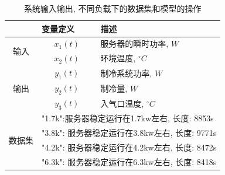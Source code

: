\begin{table}[ht]
    \centering
\caption{系统输入输出, 不同负载下的数据集和模型的操作}
\label{tab:sys_in_out_prior}
\begin{tabular}{cll}
\toprule
\multicolumn{1}{c}{}                                  & 变量定义                      & 描述                                    \\ \hline
\multicolumn{1}{c|}{\multirow{2}{*}{输入}}          & \multicolumn{1}{c|}{$x_1(t)$}& 服务器的瞬时功率,  $W$            \\ \cline{2-3} 
\multicolumn{1}{c|}{}                                 & \multicolumn{1}{c|}{$x_2(t)$}& 环境温度, $^{\circ}C$          \\ \hline
\multicolumn{1}{c|}{\multirow{3}{*}{输出}}         & \multicolumn{1}{c|}{$y_1(t)$}& 制冷系统功率,  $W$                  \\ \cline{2-3} 
\multicolumn{1}{c|}{}                                 & \multicolumn{1}{c|}{$y_2(t)$} & 制冷量,  $W$                     \\ \cline{2-3} 
\multicolumn{1}{c|}{}                                 & \multicolumn{1}{c|}{$y_3(t)$}& 入气口温度,  $^{\circ}C$  \\ \hline
\multicolumn{1}{c|}{\multirow{4}{*}{数据集}} & \multicolumn{2}{l}{"1.7k":服务器稳定运行在1.7kw左右, 长度: 8853s}  \\ \cline{2-3} 
\multicolumn{1}{c|}{}                                 & \multicolumn{2}{l}{"3.8k": 服务器稳定运行在3.8kw左右, 长度: 9771s}  \\ \cline{2-3} 
\multicolumn{1}{c|}{}                                 &
\multicolumn{2}{l}{"4.2k": 服务器稳定运行在4.2kw左右, 长度: 8472s}  \\ \cline{2-3} 
\multicolumn{1}{c|}{}                                 &
\multicolumn{2}{l}{"6.3k": 服务器稳定运行在6.3kw左右, 长度: 8418s} \\ \hline
\end{tabular}
\end{table}

